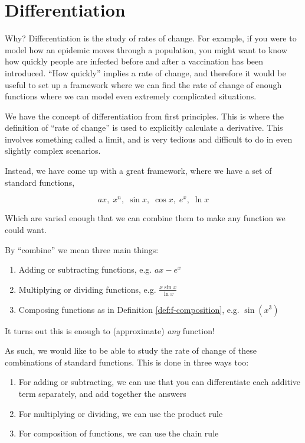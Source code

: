 \section{Differentiation}

Why? Differentiation is the study of rates of change. For example, if you were to model how an epidemic moves through a population, you might want to know how quickly people are infected before and after a vaccination has been introduced. ``How quickly'' implies a rate of change, and therefore it would be useful to 
set up a framework where we can find the rate of change of enough functions where we can model even extremely complicated situations.

We have the concept of differentiation from first principles. This is where the definition of ``rate of change'' is used to explicitly calculate a derivative. 
This involves something called a limit, and is very tedious and difficult to do in even slightly complex scenarios.

Instead, we have come up with a great framework, where we have a set of standard functions,

\[ ax, \; x^n, \; \sin x, \; \cos x, \; e^x, \; \ln x\]

Which are varied enough that we can combine them to make any function we could want.

By ``combine'' we mean three main things:

\begin{enumerate}
    \item Adding or subtracting functions, e.g. $ax - e^x$
    \item Multiplying or dividing functions, e.g. $\frac{x \sin x}{\ln x}$
    \item Composing functions as in Definition \ref{def:f-composition}, e.g. $\sin(x^3)$
\end{enumerate}

It turns out this is enough to (approximate) \emph{any} function!

As such, we would like to be able to study the rate of change of these combinations of standard functions. This is done in three ways too:

\begin{enumerate}
    \item For adding or subtracting, we can use that you can differentiate each additive term separately, and add together the answers
    \item For multiplying or dividing, we can use the product rule
    \item For composition of functions, we can use the chain rule
\end{enumerate}

